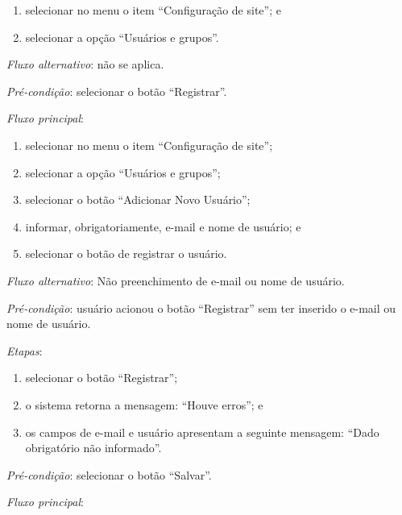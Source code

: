 \begin{enumerate}
    \item selecionar no menu o item ``Configuração de site''; e
    \item selecionar a opção ``Usuários e grupos''.
\end{enumerate}

\noindent \textit{Fluxo alternativo}: não se aplica.



\vspace{0.7cm}

\noindent \textit{Pré-condição}: selecionar o botão ``Registrar''.

\noindent \textit{Fluxo principal}:

\begin{enumerate}
    \item selecionar no menu o item ``Configuração de site'';
    \item selecionar a opção ``Usuários e grupos'';
    \item selecionar o botão ``Adicionar Novo Usuário'';
    \item informar, obrigatoriamente, e-mail e nome de usuário; e
    \item selecionar o botão de registrar o usuário.
\end{enumerate}

\noindent \textit{Fluxo alternativo}: Não preenchimento de e-mail ou nome de usuário.

\noindent \textit{Pré-condição}: usuário acionou o botão ``Registrar'' sem ter inserido o e-mail ou nome de usuário.

\noindent \textit{Etapas}:

\begin{enumerate}
    \item selecionar o botão ``Registrar'';
    \item o sistema retorna a mensagem: ``Houve erros''; e
    \item os campos de e-mail e usuário apresentam a seguinte mensagem: ``Dado obrigatório não informado''.
\end{enumerate}


\vspace{0.7cm}

\noindent \textit{Pré-condição}: selecionar o botão ``Salvar''.

\noindent \textit{Fluxo principal}:

